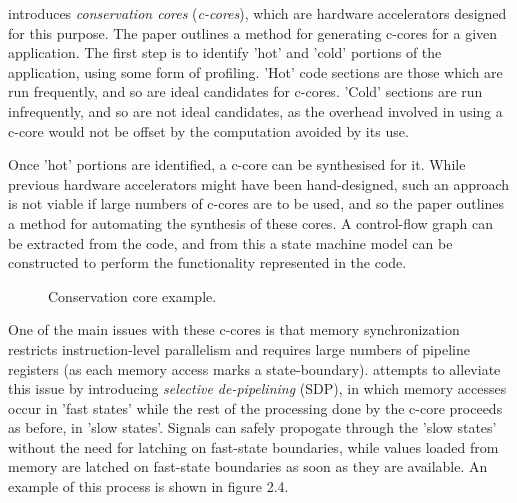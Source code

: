 \documentclass{UoYCSproject}
\begin{document}
\cite{c-cores} introduces \textit{conservation cores} (\textit{c-cores}), which are hardware accelerators
designed for this purpose. The paper outlines a method for generating c-cores for a given application.
The first step is to identify 'hot' and 'cold' portions of the application, using some form of profiling.
'Hot' code sections are those which are run frequently, and so are ideal candidates for c-cores. 'Cold' sections
are run infrequently, and so are not ideal candidates, as the overhead involved in using a c-core would
not be offset by the computation avoided by its use.

Once 'hot' portions are identified, a c-core can be synthesised for it. While previous hardware accelerators
might have been hand-designed, such an approach is not viable if large numbers of c-cores are to be used, and so
the paper outlines a method for automating the synthesis of these cores. A control-flow graph can be extracted
from the code, and from this a state machine model can be constructed to perform the functionality represented
in the code.

\begin{figure}[h]
\caption{Conservation core example. \cite{c-cores}}
\end{figure}

One of the main issues with these c-cores is that memory synchronization restricts instruction-level parallelism
and requires large numbers of pipeline registers (as each memory access marks a state-boundary). \cite{eco-cores} attempts
to alleviate this issue by introducing \textit{selective de-pipelining} (SDP), in which memory accesses occur in 'fast states'
while the rest of the processing done by the c-core proceeds as before, in 'slow states'.
Signals can safely propogate through the 'slow states' without the need for latching on fast-state boundaries,
while values loaded from memory are latched on fast-state boundaries as soon as they are available.
An example of this process is shown in figure 2.4.
\end{document}
